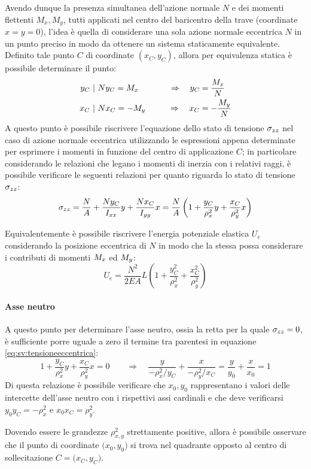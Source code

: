 	    Avendo dunque la presenza simultanea dell'azione normale $N$ e dei momenti flettenti $M_x,M_y$, tutti applicati nel centro del baricentro della trave (coordinate $x=y=0$), l'idea è quella di considerare una sola azione normale eccentrica $N$ in un punto preciso in modo da ottenere un sistema staticamente equivalente. Definito tale punto $C$ di coordinate $(x_C, y_C)$, allora per equivalenza statica è possibile determinare il punto:
	    \begin{align*}
	    	y_C \ &| \ N y_C = M_x \qquad  & \Rightarrow \quad y_C &= \frac {M_x} N \\
	    	x_C \ &| \ N x_C = -M_y \qquad & \Rightarrow \quad x_C &= - \frac {M_y} N 
	    \end{align*}
    	A questo punto è possibile riscrivere l'equazione dello stato di tensione $\sigma_{zz}$ nel caso di azione normale eccentrica utilizzando le espressioni appena determinate per esprimere i momenti in funzione del centro di applicazione $C$; in particolare considerando le relazioni che legano i momenti di inerzia con i relativi raggi, è possibile verificare le seguenti relazioni per quanto riguarda lo stato di tensione $\sigma_{zz}$:
    	\begin{equation} \label{eq:sv:tensioneeccentrica}
	    	\sigma_{zz} = \frac N A + \frac {Ny_C}{I_{xx}} y + \frac{Nx_C}{I_{yy}}x = \frac N A \left( 1 + \frac{y_C}{\rho_x^2}y + \frac{x_C}{\rho_y^2}x \right)
    	\end{equation}
    	
    	Equivalentemente è possibile riscrivere l'energia potenziale elastica $U_e$ considerando la posizione eccentrica di $N$ in modo che la stessa possa considerare i contributi di momenti $M_x$ ed $M_y$:
    	\[ U_e = \frac{N^2}{2EA}L \left( 1 + \frac{y_C^2}{\rho_x^2} + \frac{x_C^2}{\rho_y^2} \right)  \]
    	
    	\paragraph{Asse neutro} A questo punto per determinare l'asse neutro, ossia la retta per la quale $\sigma_{zz} = 0$, è sufficiente porre uguale a zero il termine tra parentesi in equazione \ref{eq:sv:tensioneeccentrica}:
    	\[ 1 +\frac{y_C}{\rho_x^2} y + \frac{x_C}{\rho_y^2}x = 0 \qquad \Rightarrow \quad \frac{y}{-\rho_x^2/y_C} + \frac x {-\rho_y^2/x_C} = \frac y {y_0} + \frac{x}{x_0} = 1  \]
    	Di questa relazione è possibile verificare che $x_0,y_0$ rappresentano i valori delle intercette dell'asse neutro con i rispettivi assi cardinali e che deve verificarsi $y_0 y_C = -\rho_x^2 $ e $x_0x_C = \rho_y^2$. 
    	\begin{osservazione}
    		Dovendo essere le grandezze $\rho_{x,y}^2$ strettamente positive, allora è possibile osservare che il punto di coordinate $\big(x_0,y_0\big)$ si trova nel quadrante opposto al centro di sollecitazione $C = \big(x_C,y_C\big)$.
    	\end{osservazione}
    	
